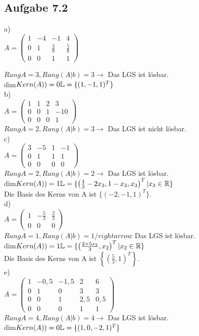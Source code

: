 \documentclass{standalone}
\begin{document}
\subsection{Aufgabe 7.2}

a)\\
$A=\left(\begin{array}{ccc|c}
	1	&-4	&-1				&4			\\
	0	&1	&\frac{3}{8}	&\frac{5}{8}\\
	0	&0	&1				&1
\end{array}\right)$

$RangA=3, Rang(A|b)=3 \rightarrow$
Das LGS ist lösbar.\\
dim$Kern(A))=0\\
\mathbb{L}=\{(1, -1, 1)^T\}$\\


b)\\
$A=\left(\begin{array}{ccc|c}
	1	&1	&2				&3		\\
	0	&0	&1				&-10	\\
	0	&0	&0				&1
\end{array}\right)$\\

$RangA=2, Rang(A|b)=3 \rightarrow$
Das LGS ist nicht lösbar.\\


c)\\
$A=\left(\begin{array}{ccc|c}
	3	&-5	&1				&-1		\\
	0	&1	&1				&1		\\
	0	&0	&0				&0
\end{array}\right)$\\

$RangA=2, Rang(A|b)=2 \rightarrow$
Das LGS ist lösbar.\\
dim$Kern(A))=1\\
\mathbb{L}=\{\left(\frac{4}{3}-2x_3, 1-x_3, x_3\right)^T | x_3 \in \mathbb{R}\}$\\
Die Basis des Kerns von A ist $\{(-2, -1, 1)^T\}$.\\


d)\\
$A=\left(\begin{array}{cc|c}
	1	&-\frac{5}{3}	&\frac{2}{3}\\
	0	&0				&0
\end{array}\right)$\\

$RangA=1, Rang(A|b)=1 /rightarrow$
Das LGS ist lösbar.\\
dim$Kern(A))=1\\
\mathbb{L}=\{\left(\frac{2+5x_2}{3}, x_2\right)^T | x_2 \in \mathbb{R}\}$\\
Die Basis des Kerns von A ist $\left\{\left(\frac{5}{3}, 1\right)^T\right\}$.\\


e)\\
$A=\left(\begin{array}{cccc|c}
	1	&-0,5	&-1,5	&2		&6	\\
	0	&1		&0		&3		&3	\\
	0	&0		&1		&2,5	&0,5\\
	0	&0		&0		&1		&1
\end{array}\right)$\\

$RangA=4, Rang(A|b)=4 \rightarrow$
Das LGS ist lösbar.\\
dim$Kern(A))=0\\
\mathbb{L}=\{(1, 0, -2, 1)^T\}$\\
\end{document}
